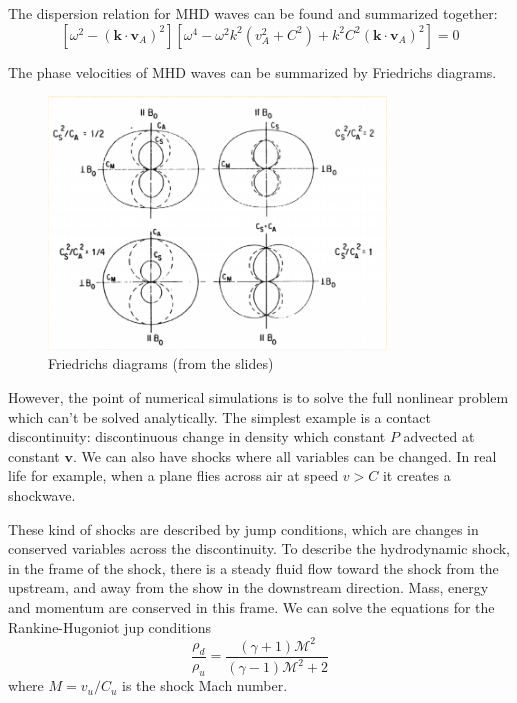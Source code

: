 \documentclass[letterpaper, 11pt]{article}
\numberwithin{equation}{section}
\numberwithin{figure}{section}
\begin{document}
The dispersion relation for MHD waves can be found and summarized together:
\begin{equation}
  \label{eq:3}
  \left[ \omega^2 - (\mathbf{k}\cdot \mathbf{v}_A)^2 \right] \left[ \omega^4 - \omega^2k^2(v_A^2 + C^2) + k^2C^2 (\mathbf{k}\cdot \mathbf{v}_A)^2 \right] = 0
\end{equation}

The phase velocities of MHD waves can be summarized by Friedrichs diagrams.
\begin{figure}[h]
  \centering
  \includegraphics[width=0.8\textwidth]{Friedrichs.png}
  \caption{Friedrichs diagrams (from the slides)}
\end{figure}

However, the point of numerical simulations is to solve the full nonlinear
problem which can't be solved analytically. The simplest example is a contact
discontinuity: discontinuous change in density which constant $P$ advected at
constant $\mathbf{v}$. We can also have shocks where all variables can be
changed. In real life for example, when a plane flies across air at speed $v >
C$ it creates a shockwave. 

These kind of shocks are described by jump conditions, which are changes in
conserved variables across the discontinuity. To describe the hydrodynamic
shock, in the frame of the shock, there is a steady fluid flow toward the shock
from the upstream, and away from the show in the downstream direction. Mass,
energy and momentum are conserved in this frame. We can solve the equations for
the Rankine-Hugoniot jup conditions
\begin{equation}
  \label{eq:5}
  \frac{\rho_d}{\rho_u} = \frac{(\gamma + 1)\mathcal{M}^2}{(\gamma - 1)\mathcal{M}^2 + 2}
\end{equation}
where $M = v_u/C_u$ is the shock Mach number.
\end{document}

